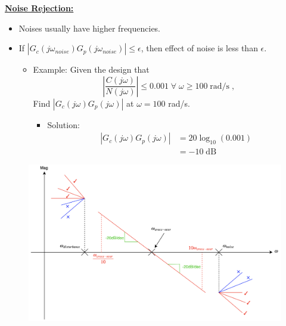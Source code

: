 \textbf{\large \underline{Noise Rejection:}}
\begin{itemize}
    \item Noises usually have higher frequencies.
    \item If $|G_c(j\omega_{noise})G_p(j\omega_{noise})|\leq \epsilon$, then effect of noise is less than $\epsilon$.
    \begin{itemize}
        \item Example: Given the design that
        \begin{equation*}
            \left|\frac{C(j\omega)}{N(j\omega)}\right|\leq 0.001 \; \forall \; \omega \geq 100 \; \text{rad/s}\; ,
        \end{equation*}
        Find $|G_c(j\omega)G_p(j\omega)|$ at $\omega = 100$ rad/s.
        \begin{itemize}
            \item Solution:
            \begin{align*}
             |G_c(j\omega)G_p(j\omega)|&=20\log_{10}(0.001) \\
             &=-10 \; \text{dB}
            \end{align*}
        \end{itemize}
    \end{itemize}
\end{itemize}

\begin{figure}[H]
    \centering
    \includegraphics[width=1.0\linewidth]{images/Bode_rejection.png}
\end{figure}